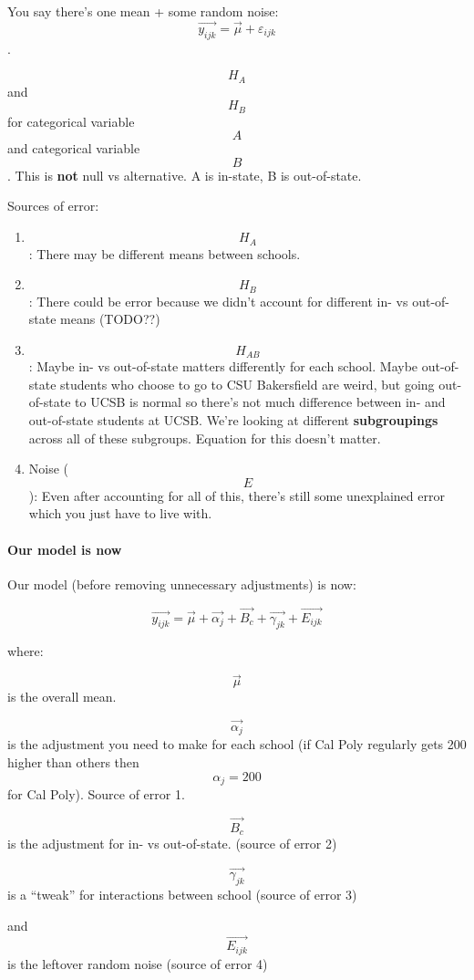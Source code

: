 \documentclass[]{article}
\providecommand{\tightlist}{%
  \setlength{\itemsep}{0pt}\setlength{\parskip}{0pt}}
\let\oldparagraph\paragraph
\renewcommand{\paragraph}[1]{\oldparagraph{#1}\mbox{}}
\begin{document}
You say there's one mean + some random noise:
\[ \vec{y_{ijk}} = \vec{\mu} + \varepsilon_{ijk} \].

\[H_A\] and \[H_B\] for categorical variable \[A\] and categorical
variable \[B\]. This is \textbf{not} null vs alternative. A is in-state,
B is out-of-state.

Sources of error:

\begin{enumerate}
\def\labelenumi{\arabic{enumi}.}
\tightlist
\item
  \[H_A\]: There may be different means between schools.
\item
  \[H_B\]: There could be error because we didn't account for different
  in- vs out-of-state means (TODO??)
\item
  \[H_{AB}\]: Maybe in- vs out-of-state matters differently for each
  school. Maybe out-of-state students who choose to go to CSU
  Bakersfield are weird, but going out-of-state to UCSB is normal so
  there's not much difference between in- and out-of-state students at
  UCSB. We're looking at different \textbf{subgroupings} across all of
  these subgroups. Equation for this doesn't matter.
\item
  Noise (\[E\]): Even after accounting for all of this, there's still
  some unexplained error which you just have to live with.
\end{enumerate}

\hypertarget{our-model-is-now}{%
\paragraph{Our model is now}\label{our-model-is-now}}

Our model (before removing unnecessary adjustments) is now:

\[\vec{y_{ijk}} = \vec{\mu} + \vec{\alpha_j} + \vec{B_c} + \vec{\gamma_{jk}} + \vec{E_{ijk}}\]

where:

\[\vec{\mu}\] is the overall mean.

\[\vec{\alpha_j}\] is the adjustment you need to make for each school
(if Cal Poly regularly gets 200 higher than others then
\[\alpha_j = 200\] for Cal Poly). Source of error 1.

\[\vec{B_c}\] is the adjustment for in- vs out-of-state. (source of
error 2)

\[\vec{\gamma_{jk}}\] is a ``tweak'' for interactions between school
(source of error 3)

and \[\vec{E_{ijk}}\] is the leftover random noise (source of error 4)
\end{document}
